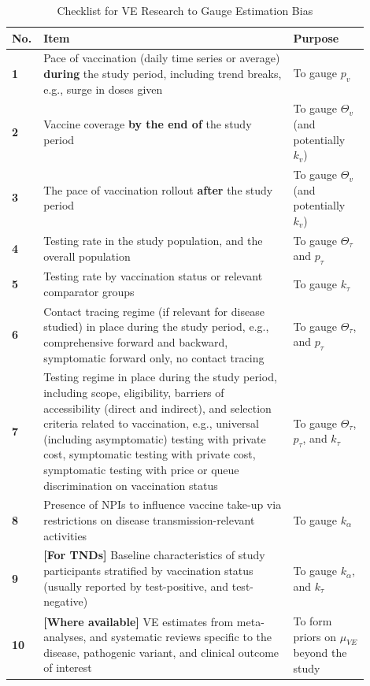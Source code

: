 \documentclass[12pt]{article}
\begin{document}
\begin{table}[H]
	\begin{center}
		\caption{Checklist for VE Research to Gauge Estimation Bias}
		\begin{tabular}{||p{0.04\linewidth}|p{0.66\linewidth}|p{0.2\linewidth}||}
			\hline \hline
			\textbf{No.} & \textbf{Item} & \textbf{Purpose} \\
			\hline \hline 
			\textbf{1} & Pace of vaccination (daily time series or average) \textbf{during} the study period, including trend breaks, e.g., surge in doses given & To gauge $p_v$ \\
			\hline
			\textbf{2} & Vaccine coverage \textbf{by the end of} the study period & To gauge $\Theta_{v}$ (and potentially $k_v$) \\
			\hline
			\textbf{3} & The pace of vaccination rollout \textbf{after} the study period & To gauge $\Theta_{v}$ (and potentially $k_v$) \\
			\hline
			\textbf{4} & Testing rate in the study population, and the overall population & To gauge $\Theta_{\tau}$ and $p_\tau$ \\
			\hline
			\textbf{5} & Testing rate by vaccination status or relevant comparator groups & To gauge $k_\tau$ \\
			\hline
			\textbf{6} & Contact tracing regime (if relevant for disease studied) in place during the study period, e.g., comprehensive forward and backward, symptomatic forward only, no contact tracing & To gauge $\Theta_{\tau}$, and $p_\tau$ \\
			\hline
			\textbf{7} & Testing regime in place during the study period, including scope, eligibility, barriers of accessibility (direct and indirect), and selection criteria related to vaccination, e.g., universal (including asymptomatic) testing with private cost, symptomatic testing with private cost, symptomatic testing with price or queue discrimination on vaccination status & To gauge $\Theta_{\tau}$, $p_\tau$, and $k_\tau$ \\
			\hline
			\textbf{8} & Presence of NPIs to influence vaccine take-up via restrictions on disease transmission-relevant activities & To gauge $k_\alpha$ \\
			\hline
			\textbf{9} & \textbf{[For TNDs]} Baseline characteristics of study participants stratified by vaccination status (usually reported by test-positive, and test-negative) & To gauge $k_\alpha$, and $k_\tau$ \\
			\hline
			\textbf{10} & \textbf{[Where available]} VE estimates from meta-analyses, and systematic reviews specific to the disease, pathogenic variant, and clinical outcome of interest & To form priors on $\mu_{VE}$ beyond the study \\
			\hline \hline
		\end{tabular}
	\end{center}
\end{table}
\end{document}
